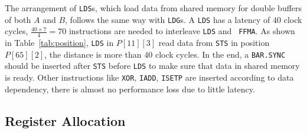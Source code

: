 The arrangement of {\tt LDS}s, which load data from shared memory for double buffers of both $A$ and $B$, follows the same way with {\tt LDG}s.
A {\tt LDS} has a latency of $40$ clock cycles, $\frac{40\times 7}{4}=70$ instructions are needed to interleave {\tt LDS} and {\tt
FFMA}. As shown in Table~\ref{tab:position}, {\tt LDS} in $P[11][3]$ read data from {\tt STS} in position $P[65][2]$, the distance is more than $40$ clock
cycles. In the end, a {\tt BAR.SYNC} should be inserted after {\tt STS} before {\tt LDS} to make sure that data in shared memory is ready. Other instructions like {\tt XOR},
{\tt IADD}, {\tt ISETP} are inserted according to data dependency, there is almost no performance loss due to little latency.


\subsection{Register Allocation}

